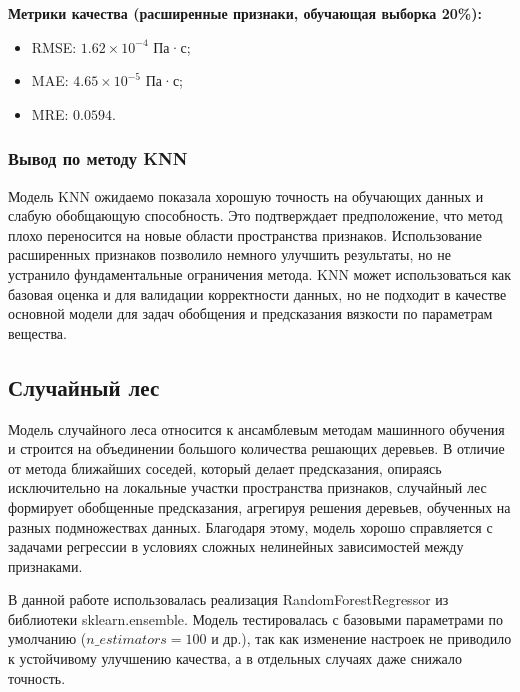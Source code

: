 \documentclass[a4paper,12pt]{article}
\begin{document}
    \vspace{5mm}
      \begin{minipage}{\textwidth}
        \textbf{Метрики качества (расширенные признаки, обучающая выборка 20\%):}
        \begin{itemize}
          \item RMSE: \( 1.62 \times 10^{-4} \) Па·с;
          \item MAE: \( 4.65 \times 10^{-5} \) Па·с;
          \item MRE: \( 0.0594 \).
        \end{itemize}
      \end{minipage}

    \subsubsection{Вывод по методу KNN}

      Модель KNN ожидаемо показала хорошую точность на обучающих данных и слабую обобщающую способность. Это подтверждает предположение, что метод плохо переносится на новые области пространства признаков. Использование расширенных признаков позволило немного улучшить результаты, но не устранило фундаментальные ограничения метода. KNN может использоваться как базовая оценка и для валидации корректности данных, но не подходит в качестве основной модели для задач обобщения и предсказания вязкости по параметрам вещества.


  \subsection{Случайный лес}

    Модель случайного леса относится к ансамблевым методам машинного обучения и строится на объединении большого количества решающих деревьев. В отличие от метода ближайших соседей, который делает предсказания, опираясь исключительно на локальные участки пространства признаков, случайный лес формирует обобщенные предсказания, агрегируя решения деревьев, обученных на разных подмножествах данных. Благодаря этому, модель хорошо справляется с задачами регрессии в условиях сложных нелинейных зависимостей между признаками.
    
    В данной работе использовалась реализация RandomForestRegressor из библиотеки sklearn.ensemble. Модель тестировалась с базовыми параметрами по умолчанию (\( n\_estimators = 100 \) и др.), так как изменение настроек не приводило к устойчивому улучшению качества, а в отдельных случаях даже снижало точность.
    
\end{document}
